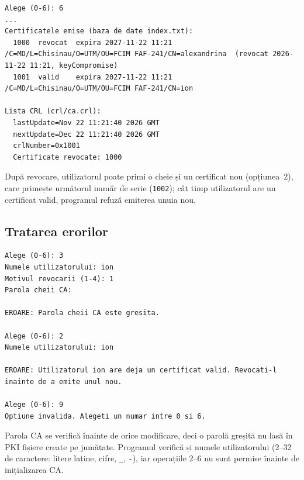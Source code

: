 \documentclass[12pt,a4paper]{article}
\begin{document}
\begin{lstlisting}[style=terminal, caption={Certificatele emise și lista CRL}]
Alege (0-6): 6
...
Certificatele emise (baza de date index.txt):
  1000  revocat  expira 2027-11-22 11:21  /C=MD/L=Chisinau/O=UTM/OU=FCIM FAF-241/CN=alexandrina  (revocat 2026-11-22 11:21, keyCompromise)
  1001  valid    expira 2027-11-22 11:21  /C=MD/L=Chisinau/O=UTM/OU=FCIM FAF-241/CN=ion

Lista CRL (crl/ca.crl):
  lastUpdate=Nov 22 11:21:40 2026 GMT
  nextUpdate=Dec 22 11:21:40 2026 GMT
  crlNumber=0x1001
  Certificate revocate: 1000
\end{lstlisting}

După revocare, utilizatorul poate primi o cheie și un certificat nou
(opțiunea~2), care primește următorul număr de serie (\texttt{1002}); cât timp
utilizatorul are un certificat valid, programul refuză emiterea unuia nou.

\subsection{Tratarea erorilor}

\begin{lstlisting}[style=terminal, caption={Parolă greșită, certificat existent, opțiune inexistentă}]
Alege (0-6): 3
Numele utilizatorului: ion
Motivul revocarii (1-4): 1
Parola cheii CA:

EROARE: Parola cheii CA este gresita.

Alege (0-6): 2
Numele utilizatorului: ion

EROARE: Utilizatorul ion are deja un certificat valid. Revocati-l inainte de a emite unul nou.

Alege (0-6): 9
Optiune invalida. Alegeti un numar intre 0 si 6.
\end{lstlisting}

Parola CA se verifică înainte de orice modificare, deci o parolă greșită nu
lasă în PKI fișiere create pe jumătate. Programul verifică și numele
utilizatorului (2--32 de caractere: litere latine, cifre, \texttt{\_},
\texttt{-}), iar operațiile 2--6 nu sunt permise înainte de inițializarea CA.

\end{document}
